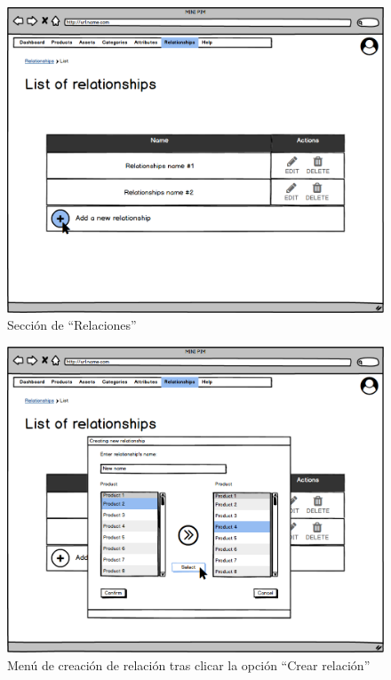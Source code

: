 \begin{figure}[H]
    \includegraphics[width=1\linewidth]{assets/mockups/RF5.1_1.png}
    \caption{Sección de \enquote{Relaciones}}
   \end{figure}
\vspace{1.0cm}

\begin{figure}[H]
    \includegraphics[width=1\linewidth]{assets/mockups/RF5.1_2.png}
    \caption{Menú de creación de relación tras clicar la opción \enquote{Crear relación}}
   \end{figure}
\vspace{1.0cm}

